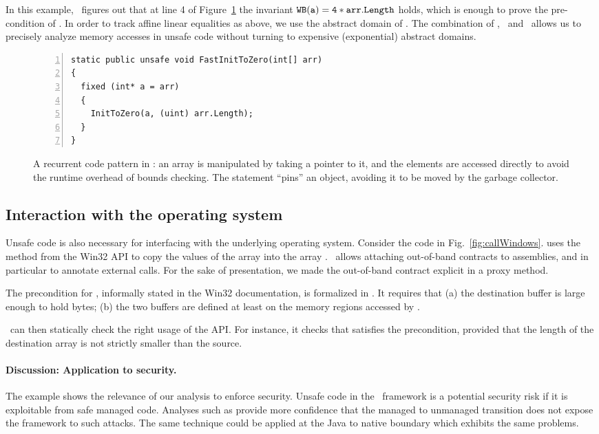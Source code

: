 \documentclass[10pt]{sigplanconf}
\begin{document}
In this example, \Clousot\ figures out that at line 4 of
Figure~\ref{fig:FastInitToZero} the invariant $\mathtt{WB}(\mathtt{a}) = \mathtt{4 *
arr.Length}$ holds, which is enough to prove the pre-condition of
.  In order to track affine linear equalities as
above, we use the abstract domain of \Karr.  The combination of
\Stripes, \Intervals\ and \Karr\ allows us to precisely analyze memory
accesses in unsafe code without turning to expensive (exponential)
abstract domains.

\begin{figure}
\begin{lstlisting}[numbers=left]
static public unsafe void FastInitToZero(int[] arr)
{
  fixed (int* a = arr)
  {
    InitToZero(a, (uint) arr.Length); 
  }
}
\end{lstlisting}
\caption{A recurrent code pattern in : an array is manipulated by taking a pointer to it, and the elements are accessed directly to avoid the runtime overhead of bounds checking.
The  statement ``pins'' an object, avoiding it to be moved by the garbage collector.
 }
\label{fig:FastInitToZero}
\end{figure}

\subsection{Interaction with the operating system}
Unsafe code is also necessary for interfacing with the underlying
operating system.  Consider the code in
Fig.~\ref{fig:callWindows}.   uses the
 method from the Win32 API to copy the values of the
array  into the array .  \Foxtrot\ allows attaching
out-of-band contracts to assemblies, and in particular to annotate external
calls.  For the sake of presentation, we made the out-of-band
contract explicit in a proxy method.

The precondition for , informally stated in the Win32
documentation, is formalized in .  It requires that
(a) the destination buffer is large enough to hold 
bytes; (b) the two buffers are defined at least
on the memory regions accessed by .

\Clousot\ can then statically check the right usage of the API.
For instance, it checks that  satisfies the precondition, provided that the length of the destination array is not strictly smaller than the source.

\paragraph{Discussion: Application to security.}
The example shows the relevance of our analysis to enforce
security. Unsafe code in the \NET\ framework is a potential security
risk if it is exploitable from safe managed code. Analyses such as
\Clousot{} provide more confidence that the managed to unmanaged
transition does not expose the framework to such attacks. The same
technique could be applied at the Java to native boundary which
exhibits the same problems.
\end{document}
